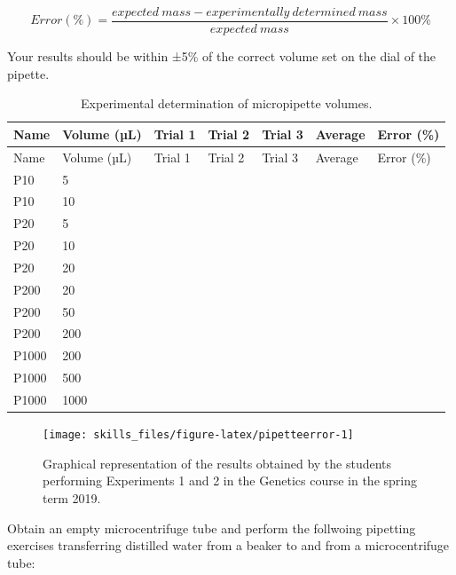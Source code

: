 \documentclass[]{book}
\begin{document}
\[ Error (\%) = \frac{expected\ mass - experimentally\ determined\ mass}{expected\ mass} \times 100\% \]

Your results should be within ±5\% of the correct volume set on the dial of the pipette.

\begin{longtable}[]{@{}lllllll@{}}
\caption{\label{tab:micro} Experimental determination of micropipette volumes.}\tabularnewline
\toprule
Name & Volume (µL) & Trial 1 & Trial 2 & Trial 3 & Average & Error (\%)\tabularnewline
\midrule
\endfirsthead
\toprule
Name & Volume (µL) & Trial 1 & Trial 2 & Trial 3 & Average & Error (\%)\tabularnewline
\midrule
\endhead
P10 & 5 & & & & &\tabularnewline
P10 & 10 & & & & &\tabularnewline
P20 & 5 & & & & &\tabularnewline
P20 & 10 & & & & &\tabularnewline
P20 & 20 & & & & &\tabularnewline
P200 & 20 & & & & &\tabularnewline
P200 & 50 & & & & &\tabularnewline
P200 & 200 & & & & &\tabularnewline
P1000 & 200 & & & & &\tabularnewline
P1000 & 500 & & & & &\tabularnewline
P1000 & 1000 & & & & &\tabularnewline
\bottomrule
\end{longtable}



\begin{figure}

{\centering \texttt{[image: skills\_files/figure-latex/pipetteerror-1]} 

}

\caption{Graphical representation of the results obtained by the students performing Experiments 1 and 2 in the Genetics course in the spring term 2019.}\label{fig:pipetteerror}
\end{figure}

Obtain an empty microcentrifuge tube and perform the follwoing pipetting exercises transferring distilled water from a beaker to and from a microcentrifuge tube:
\end{document}
